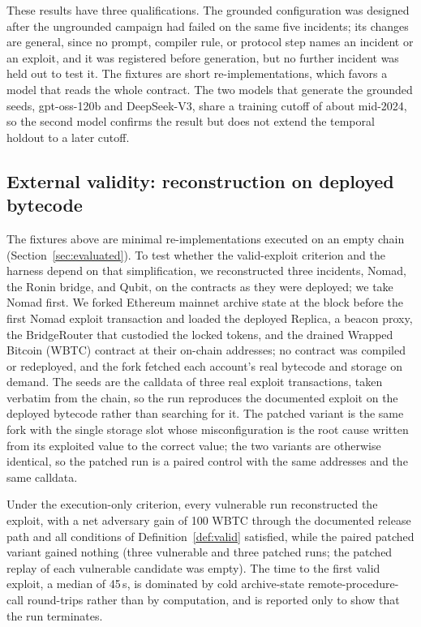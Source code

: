 \documentclass[a4paper]{cas-sc}
\begin{document}
These results have three qualifications. The grounded configuration was designed after the ungrounded campaign had failed on the same five incidents; its changes are general, since no prompt, compiler rule, or protocol step names an incident or an exploit, and it was registered before generation, but no further incident was held out to test it. The fixtures are short re-implementations, which favors a model that reads the whole contract. The two models that generate the grounded seeds, gpt-oss-120b and DeepSeek-V3, share a training cutoff of about mid-2024, so the second model confirms the result but does not extend the temporal holdout to a later cutoff.

\subsection{External validity: reconstruction on deployed bytecode}\label{sec:rq-fork}

The fixtures above are minimal re-implementations executed on an empty chain (Section~\ref{sec:evaluated}). To test whether the valid-exploit criterion and the harness depend on that simplification, we reconstructed three incidents, Nomad, the Ronin bridge, and Qubit, on the contracts as they were deployed; we take Nomad first. We forked Ethereum mainnet archive state at the block before the first Nomad exploit transaction and loaded the deployed Replica, a beacon proxy, the BridgeRouter that custodied the locked tokens, and the drained Wrapped Bitcoin (WBTC) contract at their on-chain addresses; no contract was compiled or redeployed, and the fork fetched each account's real bytecode and storage on demand. The seeds are the calldata of three real exploit transactions, taken verbatim from the chain, so the run reproduces the documented exploit on the deployed bytecode rather than searching for it. The patched variant is the same fork with the single storage slot whose misconfiguration is the root cause written from its exploited value to the correct value; the two variants are otherwise identical, so the patched run is a paired control with the same addresses and the same calldata.

Under the execution-only criterion, every vulnerable run reconstructed the exploit, with a net adversary gain of 100 WBTC through the documented release path and all conditions of Definition~\ref{def:valid} satisfied, while the paired patched variant gained nothing (three vulnerable and three patched runs; the patched replay of each vulnerable candidate was empty). The time to the first valid exploit, a median of 45\,s, is dominated by cold archive-state remote-procedure-call round-trips rather than by computation, and is reported only to show that the run terminates.
\end{document}
